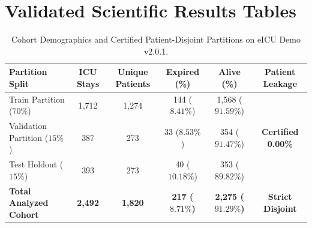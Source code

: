 \documentclass{article}
\begin{document}
\section*{Validated Scientific Results Tables}

\begin{table}[htbp]
\centering
\small
\caption{Cohort Demographics and Certified Patient-Disjoint Partitions on eICU Demo v2.0.1.}
\label{tab:dataset_partitions}
\begin{tabular}{lccccc}
\toprule
\textbf{Partition Split} & \textbf{ICU Stays} & \textbf{Unique Patients} & \textbf{Expired (\%)} & \textbf{Alive (\%)} & \textbf{Patient Leakage} \\
\midrule
Train Partition ($70\%$) & 1,712 & 1,274 & 144 ($8.41\%$) & 1,568 ($91.59\%$) & \multirow{3}{*}{\textbf{Certified 0.00\%}} \\
Validation Partition ($15\%$) & 387 & 273 & 33 ($8.53\%$) & 354 ($91.47\%$) & \\
Test Holdout ($15\%$) & 393 & 273 & 40 ($10.18\%$) & 353 ($89.82\%$) & \\
\midrule
\textbf{Total Analyzed Cohort} & \textbf{2,492} & \textbf{1,820} & \textbf{217 ($8.71\%$)} & \textbf{2,275 ($91.29\%$)} & \textbf{Strict Disjoint} \\
\bottomrule
\end{tabular}
\end{table}

\vspace{1em}
\end{document}
